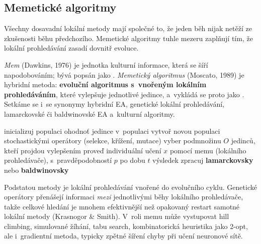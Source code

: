 \documentclass[11pt,a4paper]{article}
\theoremstyle{definition}
\begin{document}
\subsection{Memetické algoritmy}

Všechny dosavadní lokální metody mají společné to, že jeden běh nijak netěží ze
zkušenosti běhu předchozího. Memetické algoritmy tuhle mezeru zaplňují tím, že lokální
prohledávání zasadí dovnitř evoluce.

\begin{defbox}
\emph{Mem} (Dawkins, 1976) je jednotka kulturní informace, která se šíří napodobováním;
bývá popsán jako . \emph{Memetický algoritmus} (Moscato, 1989) je
hybridní metoda: \textbf{evoluční algoritmus s~vnořeným lokálním prohledáváním}, které
vylepšuje jednotlivé jedince, a~vykládá se proto jako . Setkáme
se i~se synonymy hybridní EA, genetické lokální prohledávání, lamarckovské či
baldwinovské EA a~kulturní algoritmy.
\end{defbox}

\begin{algorithm}[!ht]
\caption{Memetický algoritmus}
\begin{algorithmic}[1]
\State inicializuj populaci
  \State ohodnoť jedince v~populaci
  \State vytvoř novou populaci stochastickými operátory (selekce, křížení, mutace)
  \State vyber podmnožinu $O$ jedinců, kteří projdou vylepšením
    \State proveď individuální učení $x$ pomocí memu (lokálního prohledávače),
      s~pravděpodobností $p$ po dobu $t$
    \State výsledek zpracuj \textbf{lamarckovsky} nebo \textbf{baldwinovsky}
  \EndFor
\EndWhile
\end{algorithmic}
\end{algorithm}

Podstatou metody je lokální prohledávání vnořené do evolučního cyklu. Genetické operátory
přenášejí informaci \emph{mezi} jednotlivými běhy lokálního prohledávače, takže celkové
hledání je mnohem efektivnější než opakovaný restart samotné lokální metody
(Krasnogor \& Smith). V~roli memu může vystupovat hill climbing, simulované žíhání, tabu
search, kombinatorická heuristika jako 2-opt, ale i~gradientní metoda, typicky zpětné
šíření chyby při učení neuronové sítě.
\end{document}
